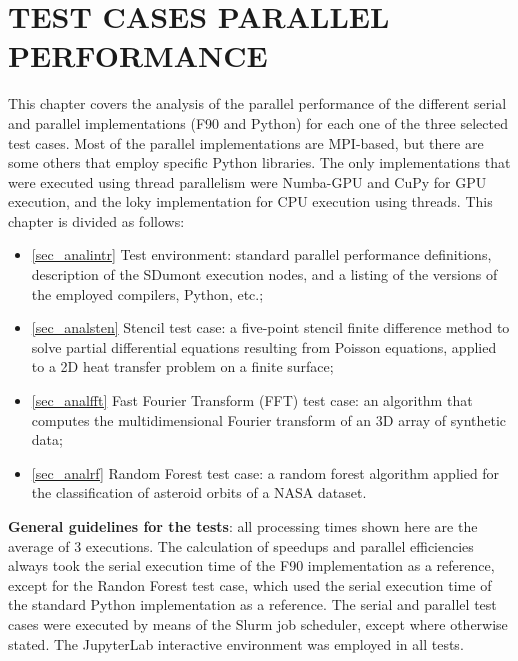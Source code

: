 \chapter{TEST CASES PARALLEL PERFORMANCE}
\label{ch_analysis}

This chapter covers the analysis of the parallel performance of the different serial and parallel implementations (F90 and Python) for each one of the three selected test cases. Most of the parallel implementations are MPI-based, but there are some others that employ specific Python libraries. The only implementations that were executed using thread parallelism were Numba-GPU and CuPy for GPU execution, and the loky implementation for CPU execution using threads. This chapter is divided as follows:

\begin{itemize}

\item\autoref {sec_analintr} Test environment: standard parallel performance definitions, description of the SDumont execution nodes, and a listing of the versions of the employed compilers, Python, etc.;

\item\autoref {sec_analsten} Stencil test case: a five-point stencil finite difference method to solve partial differential equations resulting from Poisson equations, applied to a 2D heat transfer problem on a finite surface;

\item\autoref {sec_analfft} Fast Fourier Transform (FFT) test case: an algorithm that computes the multidimensional Fourier transform of an 3D array of synthetic data; 

\item\autoref {sec_analrf} Random Forest test case: a random forest algorithm applied for the classification of asteroid orbits of a NASA dataset.

\end{itemize}

\textbf{General guidelines for the tests}: all processing times shown here are the average of 3 executions. The calculation of speedups and parallel efficiencies always took the serial execution time of the F90 implementation as a reference, except for the Randon Forest test case, which used the serial execution time of the standard Python implementation as a reference. The serial and parallel test cases were executed by means of the Slurm job scheduler, except where otherwise stated. The JupyterLab interactive environment was employed in all tests.

